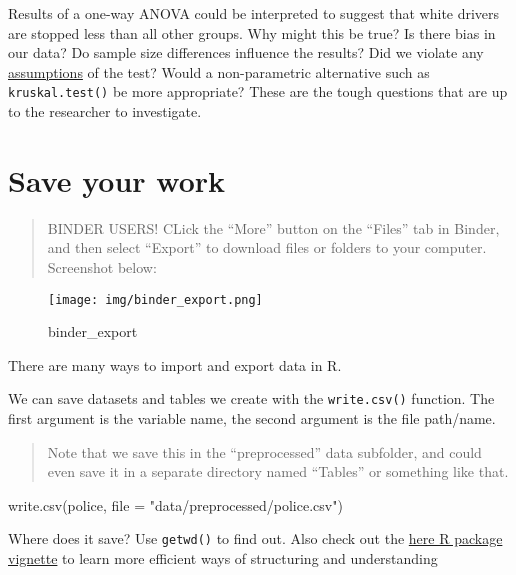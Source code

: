 \documentclass[
]{article}
\newenvironment{Shaded}{\begin{snugshade}}{\end{snugshade}}
\newcommand{\AttributeTok}[1]{\textcolor[rgb]{0.77,0.63,0.00}{#1}}
\newcommand{\FunctionTok}[1]{\textcolor[rgb]{0.00,0.00,0.00}{#1}}
\newcommand{\NormalTok}[1]{#1}
\newcommand{\StringTok}[1]{\textcolor[rgb]{0.31,0.60,0.02}{#1}}
\begin{document}
Results of a one-way ANOVA could be interpreted to suggest that white
drivers are stopped less than all other groups. Why might this be true?
Is there bias in our data? Do sample size differences influence the
results? Did we violate any
\href{http://www.sthda.com/english/wiki/one-way-anova-test-in-r}{assumptions}
of the test? Would a non-parametric alternative such as
\texttt{kruskal.test()} be more appropriate? These are the tough
questions that are up to the researcher to investigate.

\hypertarget{save-your-work}{%
\section{Save your work}\label{save-your-work}}

\begin{quote}
BINDER USERS! CLick the ``More'' button on the ``Files'' tab in Binder,
and then select ``Export'' to download files or folders to your
computer. Screenshot below:
\end{quote}

\begin{figure}
\centering
\texttt{[image: img/binder\_export.png]}
\caption{binder\_export}
\end{figure}

There are many ways to import and export data in R.

We can save datasets and tables we create with the \texttt{write.csv()}
function. The first argument is the variable name, the second argument
is the file path/name.

\begin{quote}
Note that we save this in the ``preprocessed'' data subfolder, and could
even save it in a separate directory named ``Tables'' or something like
that.
\end{quote}

\begin{Shaded}
\begin{Highlighting}[]
\FunctionTok{write.csv}\NormalTok{(police, }\AttributeTok{file =} \StringTok{"data/preprocessed/police.csv"}\NormalTok{)}
\end{Highlighting}
\end{Shaded}

Where does it save? Use \texttt{getwd()} to find out. Also check out the
\href{https://cran.r-project.org/web/packages/here/vignettes/here.html}{here
R package vignette} to learn more efficient ways of structuring and
understanding
\end{document}
